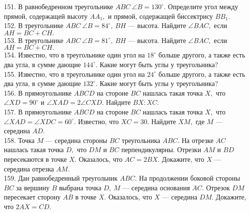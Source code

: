 151. В равнобедренном треугольнике $ABC\ \angle B = 130^\circ.$ Определите угол между прямой, содержащей высоту $AA_1,$ и прямой, содержащей биссектрису $BB_1.$\\
152. В треугольнике $ABC\ \angle B = 84^\circ,\ BH$ --- высота. Найдите $\angle BAC,$ если $AH=BC+CH.$\\
153. В треугольнике $ABC\ \angle B = 81^\circ,\ BH$ --- высота. Найдите $\angle BAC,$ если $AH=BC+CH.$\\
154. Известно, что в треугольнике один угол на $18^\circ$ больше другого, а также есть два угла, в сумме дающие $144^\circ.$ Какие могут быть углы у треугольника?\\
155. Известно, что в треугольнике один угол на $24^\circ$ больше другого, а также есть два угла, в сумме дающие $132^\circ.$ Какие могут быть углы у треугольника?\\
156. В прямоугольнике $ABCD$ на стороне $BC$ нашлась такая точка $X,$ что $\angle XD = 90^\circ$ и $\angle XAD =2\angle CXD.$ Найдите $BX : XC.$\\
157. В прямоугольнике $ABCD$ на стороне $BC$ нашлась такая точка $X,$ что $\angle XAD = \angle XDC = 60^\circ.$ Известно, что $XC = 30.$ Найдите $XM,$ где $M$ — середина $AD.$\\
158. Точка $M$ --- середина стороны $BC$ треугольника $ABC.$ На отрезке $AC$ нашлась такая точка $D,$ что $DM$ и $BC$ перпендикулярны. Отрезки $AM$ и $BD$ пересекаются в точке $X.$ Оказалось, что
$AC = 2BX.$ Докажите, что $X$ --- середина отрезка $AM.$\\
159. Дан равнобедренный треугольник $ABC.$ На продолжении боковой стороны $BC$ за вершину $B$ выбрана точка $D,\ M$ --- середина основания $AC.$
Отрезок $DM$ пересекает сторону $AB$ в точке $X.$ Оказалось, что $X$ --- середина $DM.$ Докажите, что $2AX = CD.$
\newpage

